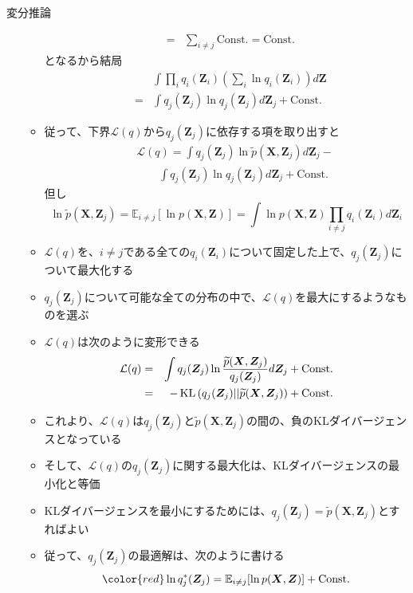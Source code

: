 \documentclass[dvipdfmx,notheorems,t]{beamer}
\begin{document}
\begin{frame}{変分推論}
\begin{itemize}
\begin{itemize}
\begin{eqnarray}
			&=& \sum_{i \neq j} \mathrm{Const.} = \mathrm{Const.}
		\end{eqnarray}
		となるから結局
		\begin{eqnarray}
			&& \int \prod_i q_i(\bm{Z}_i) \left( \sum_i \ln q_i(\bm{Z}_i) \right) d\bm{Z} \nonumber \\
			&=& \int q_j(\bm{Z}_j) \ln q_j(\bm{Z}_j) d\bm{Z}_j + \mathrm{Const.}
		\end{eqnarray}
		
		\item 従って、下界$\mathcal{L}(q)$から$q_j(\bm{Z}_j)$に依存する項を取り出すと
		\begin{eqnarray}
			&& \mathcal{L}(q) = \int q_j(\bm{Z}_j) \ln \widetilde{p}(\bm{X}, \bm{Z}_j) d\bm{Z}_j - \nonumber \\
			&& \qquad \int q_j(\bm{Z}_j) \ln q_j(\bm{Z}_j) d\bm{Z}_j + \mathrm{Const.}
		\end{eqnarray}
		但し
		\begin{equation}
			\ln \widetilde{p}(\bm{X}, \bm{Z}_j) = \mathbb{E}_{i \neq j}[\ln p(\bm{X}, \bm{Z})] = \int \ln p(\bm{X}, \bm{Z}) \prod_{i \neq j} q_i(\bm{Z}_i) d\bm{Z}_i
		\end{equation}
		
		\item $\mathcal{L}(q)$を、$i \neq j$である全ての$q_i(\bm{Z}_i)$について固定した上で、$q_j(\bm{Z}_j)$について最大化する
		\item $q_j(\bm{Z}_j)$について可能な全ての分布の中で、$\mathcal{L}(q)$を最大にするようなものを選ぶ
		
		\item $\mathcal{L}(q)$は次のように変形できる
		\begin{eqnarray}
			\mathcal{L}(q) &=& \int q_j(\bm{Z}_j) \ln \frac{\widetilde{p}(\bm{X}, \bm{Z}_j)}{q_j(\bm{Z}_j)} d\bm{Z}_j + \mathrm{Const.} \\
			&=& - \operatorname{KL} \left( q_j(\bm{Z}_j) || \widetilde{p}(\bm{X}, \bm{Z}_j) \right) + \mathrm{Const.}
		\end{eqnarray}
		
		\item これより、$\mathcal{L}(q)$は$q_j(\bm{Z}_j)$と$\widetilde{p}(\bm{X}, \bm{Z}_j)$の間の、負のKLダイバージェンスとなっている
		\item そして、$\mathcal{L}(q)$の$q_j(\bm{Z}_j)$に関する最大化は、\alert{KLダイバージェンスの最小化}と等価
		\newline
		\item KLダイバージェンスを最小にするためには、$q_j(\bm{Z}_j) = \widetilde{p}(\bm{X}, \bm{Z}_j)$とすればよい
		\newline
		\item 従って、$q_j(\bm{Z}_j)$の最適解は、次のように書ける
		\begin{equation}
			\color{red}\ln q_j^*(\bm{Z}_j) = \mathbb{E}_{i \neq j}[\ln p(\bm{X}, \bm{Z})] + \mathrm{Const.}\normalcolor
		\end{equation}
	\end{itemize}
\end{itemize}

\end{frame}
\end{document}
